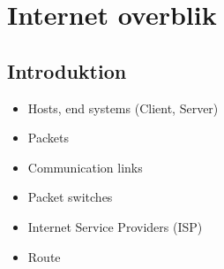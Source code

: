 \section{Internet overblik}

\subsection{Introduktion}
\begin{itemize}
	\item Hosts, end systems (Client, Server)
	\item Packets
	\item Communication links
	\item Packet switches
	\item Internet Service Providers (ISP)
	\item Route
\end{itemize}

